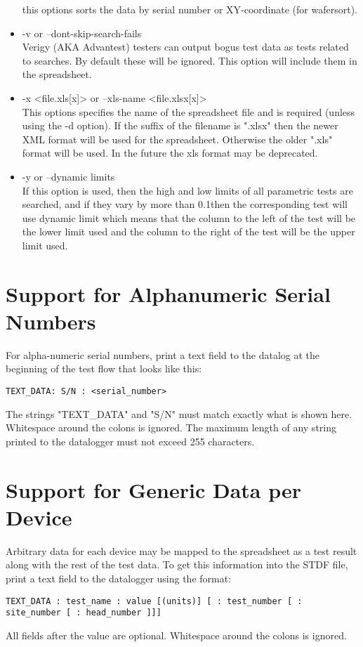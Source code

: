 \documentclass[letterpaper]{article}
\begin{document}
\begin{itemize}
this options sorts the data by serial number or XY-coordinate (for wafersort).
\item -v or --dont-skip-search-fails\\
Verigy (AKA Advantest) testers can output bogus test data as tests related to searches.  By default
these will be ignored.  This option will include them in the spreadsheet.
\item -x <file.xls[x]> or --xls-name <file.xlsx[x]>\\
This options specifies the name of the spreadsheet file and is required (unless using the -d option).
If the suffix of the filename is ".xlsx" then the newer XML format will be used for the spreadsheet.
Otherwise the older ".xls" format will be used.  In the future the xls format may be deprecated.
\item -y or --dynamic limits\\
If this option is used, then the high and low limits of all parametric tests are
searched, and if they vary by more than 0.1\percent then the corresponding test will use dynamic limit
which means that the column to the left of the test will be the lower limit used and the column to
the right of the test will be the upper limit used.
\end{itemize}
\clearpage
\section{Support for Alphanumeric Serial Numbers}
For alpha-numeric serial numbers, print a text field to the datalog
at the beginning of the test flow that looks like this:

\begin{verbatim}
TEXT_DATA: S/N : <serial_number>
\end{verbatim}
The strings "TEXT\_DATA" and "S/N" must match exactly what is shown here.  Whitespace
around the colons is ignored.  The maximum length of any string printed to the datalogger
must not exceed 255 characters.

\section{Support for Generic Data per Device}
Arbitrary data for each device may be mapped to the spreadsheet as a test result along
with the rest of the test data.  To get this information into the STDF file, print a 
text field to the datalogger using the format:
\begin{verbatim}
TEXT_DATA : test_name : value [(units)] [ : test_number [ : site_number [ : head_number ]]]
\end{verbatim}
All fields after the value are optional.  Whitespace around the colons is ignored.
\end{document}
